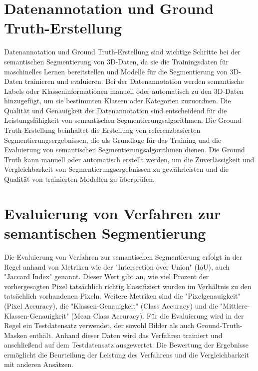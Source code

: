 \section{Datenannotation und Ground Truth-Erstellung}

Datenannotation und Ground Truth-Erstellung sind wichtige Schritte bei der
semantischen Segmentierung von 3D-Daten, da sie die Trainingsdaten für
maschinelles Lernen bereitstellen und Modelle für die Segmentierung von
3D-Daten trainieren und evaluieren. Bei der Datenannotation werden semantische
Labels oder Klasseninformationen manuell oder automatisch zu den 3D-Daten
hinzugefügt, um sie bestimmten Klassen oder Kategorien zuzuordnen. Die Qualität
und Genauigkeit der Datenannotation sind entscheidend für die
Leistungsfähigkeit von semantischen Segmentierungsalgorithmen. Die Ground
Truth-Erstellung beinhaltet die Erstellung von referenzbasierten
Segmentierungsergebnissen, die als Grundlage für das Training und die
Evaluierung von semantischen Segmentierungsalgorithmen dienen. Die Ground Truth
kann manuell oder automatisch erstellt werden, um die Zuverlässigkeit und
Vergleichbarkeit von Segmentierungsergebnissen zu gewährleisten und die
Qualität von trainierten Modellen zu überprüfen.

\section{Evaluierung von Verfahren zur semantischen Segmentierung}
Die Evaluierung von Verfahren zur semantischen Segmentierung erfolgt in der
Regel anhand von Metriken wie der "Intersection over Union" (IoU), auch
"Jaccard Index" genannt. Dieser Wert gibt an, wie viel Prozent der
vorhergesagten Pixel tatsächlich richtig klassifiziert wurden im Verhältnis zu
den tatsächlich vorhandenen Pixeln. Weitere Metriken sind die
"Pixelgenauigkeit" (Pixel Accuracy), die "Klassen-Genauigkeit" (Class Accuracy)
und die "Mittlere-Klassen-Genauigkeit" (Mean Class Accuracy). Für die
Evaluierung wird in der Regel ein Testdatensatz verwendet, der sowohl Bilder
als auch Ground-Truth-Masken enthält. Anhand dieser Daten wird das Verfahren
trainiert und anschließend auf dem Testdatensatz ausgewertet. Die Bewertung der
Ergebnisse ermöglicht die Beurteilung der Leistung des Verfahrens und die
Vergleichbarkeit mit anderen Ansätzen.
